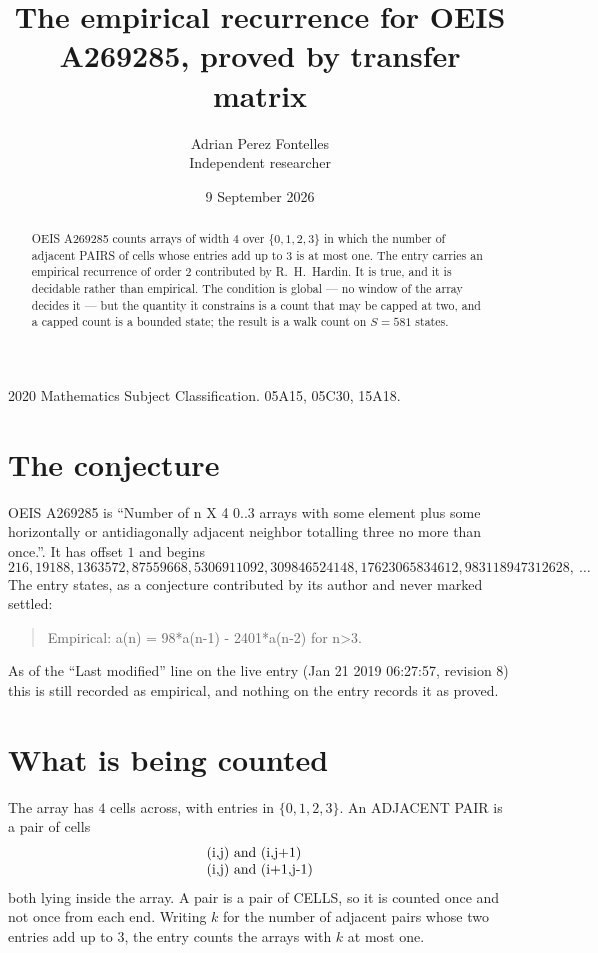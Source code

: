\documentclass[11pt,a4paper]{article}
\title{The empirical recurrence for OEIS A269285, proved by transfer matrix}
\author{Adrian Perez Fontelles\\ \small Independent researcher}
\date{9 September 2026}
\theoremstyle{plain}
\theoremstyle{definition}
\begin{document}
\maketitle

\begin{abstract}
OEIS A269285 counts arrays of width $4$ over $\{0,1,2,3\}$ in which the number of adjacent PAIRS of
cells whose entries add up to $3$ is at most one. The entry carries an empirical recurrence of
order $2$ contributed by R.~H.~Hardin. It is true, and it is decidable rather than
empirical. The condition is global --- no window of the array decides it --- but the quantity
it constrains is a count that may be capped at two, and a capped count is a bounded state; the
result is a walk count on $S=581$ states.
\end{abstract}

\noindent\small 2020 Mathematics Subject Classification. 05A15, 05C30, 15A18.\normalsize

\section{The conjecture}

OEIS A269285 is ``Number of n X 4 0..3 arrays with some element plus some horizontally or antidiagonally adjacent neighbor totalling three no more than once.''. It has offset $1$ and begins
\[
216, 19188, 1363572, 87559668, 5306911092, 309846524148, 17623065834612, 983118947312628,\ \dots
\]
The entry states, as a conjecture contributed by its author and never marked settled:
\begin{quote}
Empirical: a(n) = 98*a(n-1) - 2401*a(n-2) for n>3.
\end{quote}
As of the ``Last modified'' line on the live entry (Jan 21 2019 06:27:57, revision 8) this is still
recorded as empirical, and nothing on the entry records it as proved.

\section{What is being counted}

The array has $4$ cells across, with entries in $\{0,1,2,3\}$. An ADJACENT PAIR is a pair of cells
\[
\begin{array}{l}
$(i,j)\text{ and }(i,j{+}1)$ \\
$(i,j)\text{ and }(i{+}1,j{-}1)$ \\
\end{array}
\]
both lying inside the array. A pair is a pair of CELLS, so it is counted once and not once from
each end. Writing $k$ for the number of adjacent pairs whose two entries add up to $3$, the
entry counts the arrays with $k$ at most one.
\end{document}

